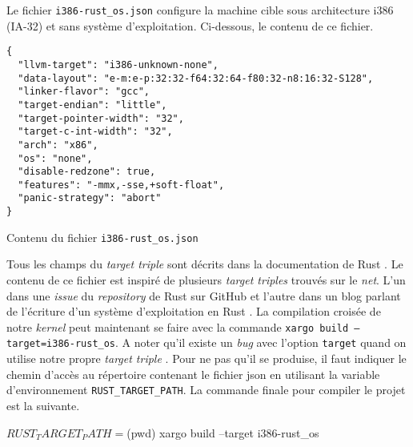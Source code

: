  \bigbreak

Le fichier \texttt{i386-rust_os.json} configure la machine cible
sous architecture i386 (\acrshort{IA-32}) et sans système d'exploitation.
Ci-dessous, le contenu de ce fichier. \\

\begin{code}
\begin{verbatim}
{
  "llvm-target": "i386-unknown-none",
  "data-layout": "e-m:e-p:32:32-f64:32:64-f80:32-n8:16:32-S128",
  "linker-flavor": "gcc",
  "target-endian": "little",
  "target-pointer-width": "32",
  "target-c-int-width": "32",
  "arch": "x86",
  "os": "none",
  "disable-redzone": true,
  "features": "-mmx,-sse,+soft-float",
  "panic-strategy": "abort"
}
\end{verbatim}
\caption{Contenu du fichier \texttt{i386-rust_os.json}}
\label{lst:rust:target}
\end{code} \bigbreak

Tous les champs du \textit{target triple} sont décrits dans la documentation de
Rust \cite{ref4}. Le contenu de ce fichier est inspiré de plusieurs \textit{target triples}
trouvés sur le \textit{net}. L'un dans une \textit{issue} du \textit{repository}
de Rust sur GitHub \cite{ref5} et l'autre dans un blog parlant de l'écriture
d'un système d'exploitation en Rust \cite{ref8}. La compilation croisée de notre
\textit{kernel} peut maintenant se faire avec la commande
\texttt{xargo build --target=i386-rust_os}. A noter qu'il existe un
\textit{bug} avec l'option \texttt{target} quand on utilise notre propre
\textit{target triple} \cite{ref7}. Pour ne pas qu'il se produise, il faut indiquer
le chemin d'accès au répertoire contenant le fichier \acrshort{json} en utilisant
la variable d'environnement \texttt{RUST_TARGET_PATH}. La commande finale
pour compiler le projet est la suivante.

\begin{shellcode}
$ RUST_TARGET_PATH=$(pwd) xargo build --target i386-rust_os
\end{shellcode}


